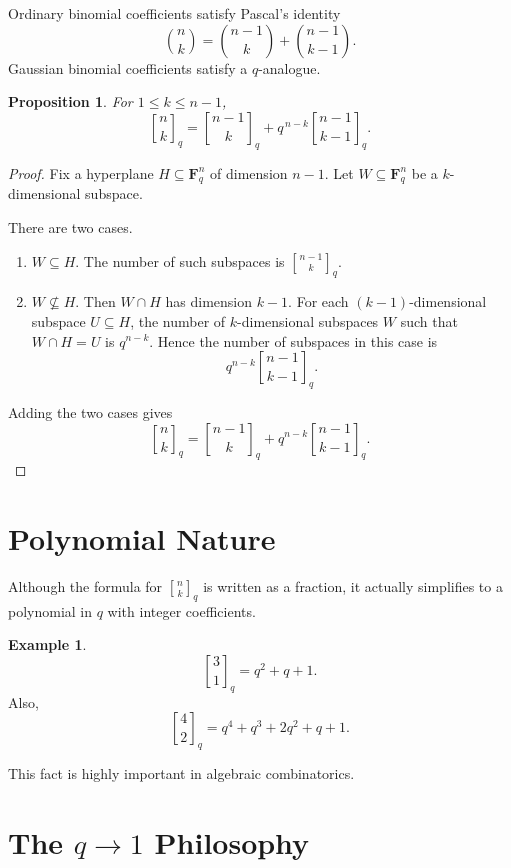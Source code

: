 \documentclass[11pt]{article}
\newtheorem{proposition}[theorem]{Proposition}
\theoremstyle{definition}
\newtheorem{example}[theorem]{Example}
\theoremstyle{remark}
\newcommand{\F}{\mathbf{F}}
\newcommand{\qbinom}[2]{\genfrac{[}{]}{0pt}{}{#1}{#2}_q}
\begin{document}
	Ordinary binomial coefficients satisfy Pascal's identity
	\[
	\binom{n}{k}=\binom{n-1}{k}+\binom{n-1}{k-1}.
	\]
	Gaussian binomial coefficients satisfy a \(q\)-analogue.
	
	\begin{proposition}
		For \(1\leq k\leq n-1\),
		\[
		\qbinom{n}{k}
		=
		\qbinom{n-1}{k}
		+
		q^{\,n-k}\qbinom{n-1}{k-1}.
		\]
	\end{proposition}
	
	\begin{proof}
		Fix a hyperplane \(H\subseteq \F_q^n\) of dimension \(n-1\). Let \(W\subseteq \F_q^n\) be a \(k\)-dimensional subspace.
		
		There are two cases.
		
		\begin{enumerate}[label=\arabic*.]
			\item \(W\subseteq H\).  
			The number of such subspaces is \(\qbinom{n-1}{k}\).
			
			\item \(W\not\subseteq H\).  
			Then \(W\cap H\) has dimension \(k-1\). For each \((k-1)\)-dimensional subspace \(U\subseteq H\), the number of \(k\)-dimensional subspaces \(W\) such that \(W\cap H=U\) is \(q^{n-k}\). Hence the number of subspaces in this case is
			\[
			q^{n-k}\qbinom{n-1}{k-1}.
			\]
		\end{enumerate}
		
		Adding the two cases gives
		\[
		\qbinom{n}{k}
		=
		\qbinom{n-1}{k}
		+
		q^{n-k}\qbinom{n-1}{k-1}.
		\]
	\end{proof}
	
	\section{Polynomial Nature}
	
	Although the formula for \(\qbinom{n}{k}\) is written as a fraction, it actually simplifies to a polynomial in \(q\) with integer coefficients.
	
	\begin{example}
		\[
		\qbinom{3}{1}=q^2+q+1.
		\]
		Also,
		\[
		\qbinom{4}{2}=q^4+q^3+2q^2+q+1.
		\]
	\end{example}
	
	This fact is highly important in algebraic combinatorics.
	
	\section{The \(q\to 1\) Philosophy}
	
\end{document}
